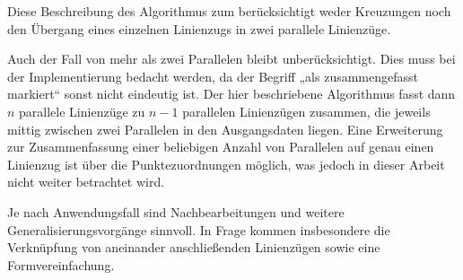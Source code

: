 \documentclass[../main/thesis.tex]{subfiles}
\begin{document}
Diese Beschreibung des Algorithmus zum  berücksichtigt
weder Kreuzungen noch den Übergang eines einzelnen Linienzugs in zwei parallele Linienzüge.

Auch der Fall von mehr als zwei Parallelen bleibt unberücksichtigt.
Dies muss bei der Implementierung bedacht werden, da der Begriff „als zusammengefasst markiert“ sonst nicht eindeutig ist.
Der hier beschriebene Algorithmus fasst dann $n$ parallele Linienzüge zu $n-1$ parallelen Linienzügen zusammen, die jeweils mittig zwischen zwei Parallelen in den Ausgangsdaten liegen.
Eine Erweiterung zur Zusammenfassung einer beliebigen Anzahl von Parallelen auf genau einen Linienzug ist über die Punktezuordnungen möglich, was jedoch in dieser Arbeit nicht weiter betrachtet wird.

Je nach Anwendungsfall sind Nachbearbeitungen und weitere Generalisierungsvorgänge sinnvoll.
In Frage kommen insbesondere die Verknüpfung von aneinander anschließenden Linienzügen sowie eine Formvereinfachung.


\end{document}
